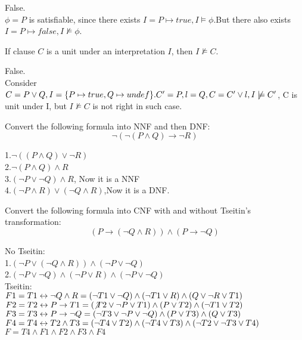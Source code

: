 \documentclass[11pt,a4paper]{article}
\newcommand{\lequiv}{\leftrightarrow}
\begin{document}
	\begin{solution}
		False.\\
		$\phi = P$ is satisfiable, since there exists $I = {P \mapsto true}, I \models \phi$.But there also exists $I = {P \mapsto false}, I \not\models \phi$.
	\end{solution}
	
	\subproblem If clause $C$ is a unit under an interpretation $I$, then $I \not\models C$.
	
	\begin{solution}
		False.\\
		Consider $C = P \lor Q, I = \{P \mapsto true, Q \mapsto undef\}. \\
		C' = P, l = Q, C = C' \lor l, I \not \models C'$, C is unit under I, but $I \not\models C$ is not right in such case. 
	\end{solution}
	
	\newpage
	
	\subproblem Convert the following formula into NNF and then DNF:
	$$\lnot(\lnot(P \land Q) \to \lnot R)$$
	
	\begin{solution}
		1.$\lnot((P \land Q) \lor \lnot R)$\\
		2.$\lnot (P \land Q) \land R$\\
		3.$(\lnot P \lor \lnot Q) \land R$, Now it is a NNF\\
		4.$(\lnot P \land R)\lor (\lnot Q \land R)$,Now it is a DNF.
	\end{solution}
	
	\subproblem Convert the following formula into CNF with and without Tseitin's transformation:
	$$(P \to (\lnot Q \land R)) \land (P \to \lnot Q)$$
	
	\begin{solution}
		No Tseitin:\\
		1.$(\lnot P \lor (\lnot Q \land R))\land(\lnot P \lor \lnot Q)$\\
		2.$(\lnot P \lor \lnot Q)\land (\lnot P \lor R) \land (\lnot P \lor \lnot Q)$\\
		Tseitin:\\
		$F1 = T1 \lequiv \lnot Q \land R \\
		= (\lnot T1 \lor \lnot Q)\land (\lnot T1 \lor R) \land (Q \lor \lnot R \lor T1)$\\
		$F2 = T2 \lequiv P \to T1 \\
		= (\not T2 \lor \lnot P \lor T1) \land (P \lor T2) \land (\lnot T1 \lor T2) $\\
		$F3 = T3 \lequiv P \to \lnot Q \\
		= (\lnot T3 \lor \lnot P \lor \lnot Q) \land (P \lor T3) \land (Q \lor T3)
		$\\
		$F4 = T4 \lequiv T2 \land T3 \\
		= (\lnot T4 \lor T2) \land (\lnot T4 \lor T3) \land (\lnot T2 \lor \lnot T3 \lor T4)
		$\\
		$F = T4 \land F1 \land F2 \land F3 \land F4$
		
	\end{solution}
	
\end{document}
